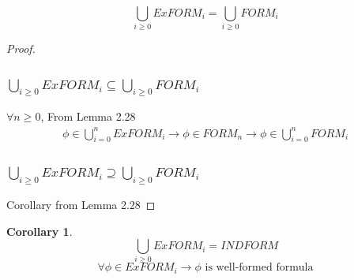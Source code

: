 \documentclass{article}
\newtheorem{corollary}[theorem]{Corollary}
\newtheorem{lemma}[theorem]{Lemma}
\let\oldlemma\lemma
\let\endoldlemma\endlemma
\renewenvironment{lemma}
  {\begin{tcolorbox}[
      colback=green!8,
      colframe=green!50!black,
      boxrule=0.6pt,
      arc=2pt,
      left=6pt,right=6pt,top=4pt,bottom=4pt
    ]\oldlemma}
  {\endoldlemma\end{tcolorbox}}
\begin{document}
\begin{lemma}
    \[\bigcup_{i\geq 0} ExFORM_i = \bigcup_{i\geq 0} FORM_i\]
\end{lemma}
\begin{proof}
    \subsubsection*{$\bigcup_{i\geq 0} ExFORM_i \subseteq \bigcup_{i\geq 0} FORM_i$}
    $\forall n \geq 0$, From Lemma 2.28
    \begin{align*}
        \phi \in \bigcup_{i= 0}^{n} ExFORM_i \rightarrow \phi \in FORM_n \rightarrow \phi \in \bigcup_{i= 0}^n FORM_i
    \end{align*}
    \subsubsection*{$\bigcup_{i\geq 0} ExFORM_i \supseteq \bigcup_{i\geq 0} FORM_i$}
    Corollary from Lemma 2.28
\end{proof}
\begin{corollary}\label{cor:exform_indform}
    \[\bigcup_{i\geq 0} ExFORM_i = INDFORM\]
    \[\forall \phi \in ExFORM_i \rightarrow \phi \text{ is well-formed formula}\]
\end{corollary}
\end{document}
